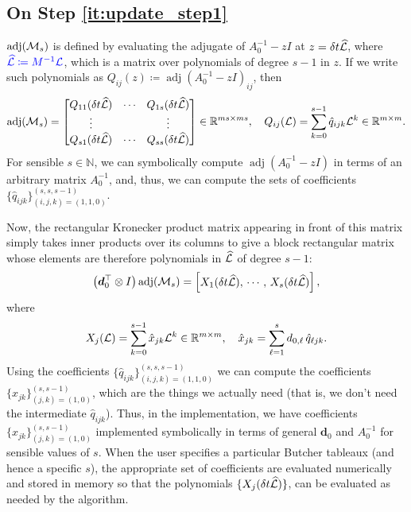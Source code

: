 \documentclass[review]{siamart}
\newcommand{\tcb}{\textcolor{blue}}
\newcommand{\madj}{\operatorname{adj}}
\begin{document}
\subsection{On Step \ref{it:update_step1}}

$\madj ({\cal M}_s)$ is defined by evaluating the adjugate of $A_0^{-1} - zI$ at $z = \delta t \widehat{\cal L}$, where $\tcb{\widehat{\cal L} \coloneqq M^{-1} {\cal L}}$, which is a matrix over polynomials of degree $s-1$ in $z$. If we write such polynomials as $Q_{ij}(z) \coloneqq \madj(A_0^{-1} - zI)_{ij}$, then
\begin{align}
\madj ({\cal M}_s) = 
\begin{bmatrix}
Q_{11}(\delta t \widehat{\cal L}) & \cdots & Q_{1s}(\delta t \widehat{\cal L}) \\
\vdots & & \vdots \\
Q_{s1}(\delta t \widehat{\cal L}) & \cdots & Q_{ss}(\delta t \widehat{\cal L})
\end{bmatrix}
\in \mathbb{R}^{ms \times ms},
\quad
Q_{ij}({\cal L}) = \sum \limits_{k = 0}^{s-1} \hat{q}_{ijk} {\cal L}^k \in \mathbb{R}^{m \times m}.
\end{align}
For sensible $s \in \mathbb{N}$, we can symbolically compute $\madj(A_0^{-1} - zI)$ in terms of an arbitrary matrix $A_0^{-1}$, and, thus, we can compute the sets of coefficients $\{ \hat{q}_{ijk} \}_{(i,j,k)=(1,1,0)}^{(s,s,s-1)}$.

Now, the rectangular Kronecker product matrix appearing in front of this matrix simply takes inner products over its columns to give a block rectangular matrix whose elements are therefore polynomials in $\widehat{\cal L}$ of degree $s-1$:
\begin{align}
\big( \bm{d}_0^\top \otimes I \big) \madj({\cal M}_s) 
=
\begin{bmatrix}
X_{1}(\delta t \widehat{\cal L}), \, \cdots, \, X_{s}(\delta t \widehat{\cal L})
\end{bmatrix},
\end{align}
where
\begin{align}
X_{j}({\cal L}) = \sum \limits_{k = 0}^{s-1} \hat{x}_{j k} {\cal L}^k \in \mathbb{R}^{m \times m}, 
\quad
\hat{x}_{j k} = \sum \limits_{\ell = 1}^s d_{0,\ell} \, \hat{q}_{\ell j k}.
\end{align}
Using the coefficients $\{ \hat{q}_{ijk} \}_{(i,j,k)=(1,1,0)}^{(s,s,s-1)}$ we can compute the coefficients $\{ \hat{x}_{jk} \}_{(j,k)=(1,0)}^{(s,s-1)}$, which are the things we actually need (that is, we don't need the intermediate $\hat{q}_{ijk}$). Thus, in the implementation, we have coefficients $\{ \hat{x}_{jk} \}_{(j,k)=(1,0)}^{(s,s-1)}$ implemented symbolically in terms of general $\bm{d}_0$ and $A_0^{-1}$ for sensible values of $s$. When the user specifies a particular Butcher tableaux (and hence a specific $s$), the appropriate set of coefficients are evaluated numerically and stored in memory so that the polynomials $\{X_{j}(\delta t \widehat{\cal L})\}$, can be evaluated as needed by the algorithm.
\end{document}
